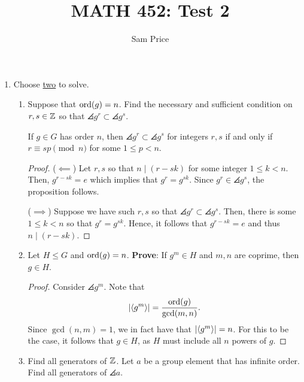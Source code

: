 \documentclass{article}
\author{Sam Price}
\title{MATH 452: Test 2}
\begin{document}
\maketitle

\begin{enumerate}[start=1,label={(\arabic*)}]
  \item Choose \underline{two} to solve.

        \begin{enumerate}[start=1,label={(\alph*)}]
          \item Suppose that $\operatorname{ord}(g) = n$.
                Find the necessary and sufficient condition on $r, s \in \mathbb{Z}^{}$ so that $\angles{g^{r}} \subset \angles{g^{s}}$.

                \begin{proposition}{}{}
                  If $g \in G$ has order $n$, then $\angles{g^{r}} \subset \angles{g^{s}}$ for integers $r, s$ if and only if $r \equiv sp \pmod{n}$ for some $1 \le p < n$.
                \end{proposition}
                \begin{proof}
                  ($\impliedby$)
                  Let $r, s$ so that $n \mid (r - sk)$ for some integer $1 \le k < n$.
                  Then, $g^{r - sk} = e$ which implies that $g^{r} = g^{sk}$. Since $g^{r} \in \angles{g^{s}}$, the proposition follows.

                  ($\implies$)
                  Suppose we have such $r, s$ so that $\angles{g^{r}} \subset \angles{g^{s}}$.
                  Then, there is some $1 \le k < n$ so that $g^{r} = g^{sk}$.
                  Hence, it follows that $g^{r - sk} = e$ and thus $n \mid (r - sk)$.
                \end{proof}


          \item Let $H \le G$ and $\operatorname{ord}(g) = n$.
                \textbf{Prove}: If $g^{m} \in H$ and $m, n$ are coprime, then $g \in H$.

                \begin{proof}
                  Consider $\angles{g^{m}}$. Note that
                  \[ \lvert\langle g^{m}\rangle\rvert = \frac{\operatorname{ord}(g)}{\gcd(m, n)}. \]
                  Since $\gcd(n, m) = 1$, we in fact have that $\lvert\langle g^{m}\rangle\rvert = n$.
                  For this to be the case, it follows that $g \in H$, as $H$ must include all $n$ powers of $g$.
                \end{proof}

          \item Find all generators of $\mathbb{Z}^{}$. Let $a$ be a group element that has infinite order.
                Find all generators of $\angles{a}$.


\end{enumerate}
\end{enumerate}
\end{document}
